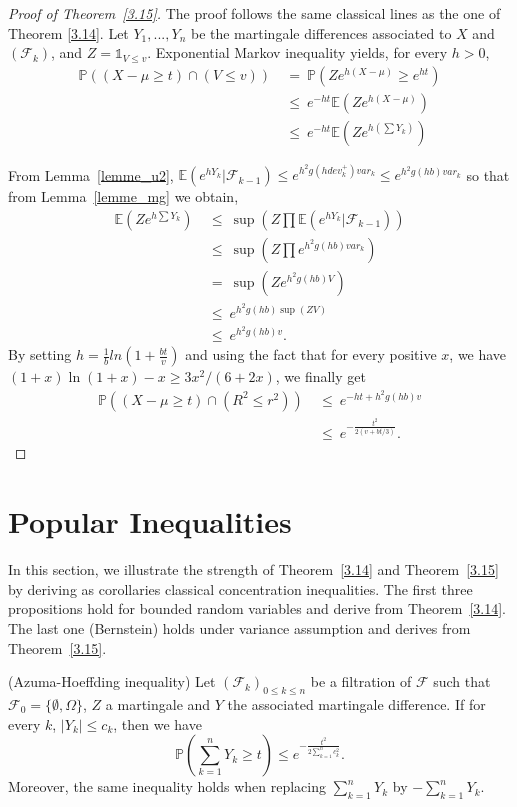 \begin{proof}[Proof of Theorem~\ref{3.15}]
The proof follows the same classical lines as the one of Theorem \ref{3.14}.
Let $Y_1,...,Y_n$ be the martingale differences associated to $X$ and $(\mathcal{F}_k)$, and
$Z=\mathds{1}_{V \leq v}$. Exponential Markov inequality yields, for every $h > 0$,
 \begin{align*}
\mathbb{P}((X-\mu \geq t)\cap(V \leq v)) 
 &~=~ \mathbb{P}(Ze^{h(X-\mu)} \geq e^{ht})\\
 &~\leq~ e^{-ht}\mathbb{E}(Ze^{h(X-\mu)})\\
 &~\leq~ e^{-ht}\mathbb{E}(Ze^{h(\sum Y_k)}) 
 \end{align*}

From Lemma~\ref{lemme_u2}, 
$\mathbb{E}(e^{hY_k}|\mathcal{F}_{k-1}) \leq e^{h^2g(hdev_k^+)var_k} \leq e^{h^2g(hb)var_k}$ so that
from Lemma~\ref{lemme_mg} we obtain,
\begin{align*}
 \mathbb{E}(Ze^{h\sum Y_k}) &~\leq~ \sup(Z \prod \mathbb{E}(e^{hY_k}|\mathcal{F}_{k-1}))\\
& ~\leq~ \sup(Z \prod e^{h^2g(hb)var_k})\\
&~=~  \sup(Z e^{h^2g(hb)V})\\
&~\leq~ e^{h^2g(hb)\sup(ZV)}\\
&~\leq~ e^{h^2g(hb)v}.
\end{align*}
By setting $h=\frac{1}{b}ln(1+\frac{bt}{v})$ and using the fact that for every positive $x$, we have $(1+x)\ln(1+x)-x \geq 3x^2/(6+2x)$, we finally get
\begin{align*} \mathbb{P}((X-\mu \geq t)\cap(R^2 \leq r^2)) &~\leq~ e^{-ht+h^2g(hb)v}\\
&~\leq~ e^{-\frac{t^2}{2(v+bt/3)}}.
\end{align*}


\end{proof}


\section{Popular Inequalities}

In this section, we illustrate the strength of Theorem~\ref{3.14} and Theorem~\ref{3.15} by deriving as corollaries classical concentration inequalities.
The first three propositions hold for bounded random variables and derive from Theorem~\ref{3.14}. The last one (Bernstein) holds under variance assumption and derives from Theorem~\ref{3.15}.

\begin{proposition} ({\sc Azuma-Hoeffding inequality})
\label{HA3.10}
Let $(\mathcal{F}_k)_{0\leq k \leq n}$ be a filtration of $\mathcal{F}$ such that $\mathcal{F}_0 =  \{\emptyset , \Omega\} $, $Z$ a martingale and $Y$ the associated martingale difference.
If for every $k$, $|Y_{k}| \leq c_{k}$, then we have $$ \mathbb{P}(\sum_{k=1}^n Y_k \geq t) \leq e^{-\frac{t^2}{2 \sum_{k=1}^n c_k^2}}.$$ Moreover, the same inequality holds when replacing $\sum_{k=1}^n Y_k$ by $-\sum_{k=1}^n Y_k$.
\end{proposition}


